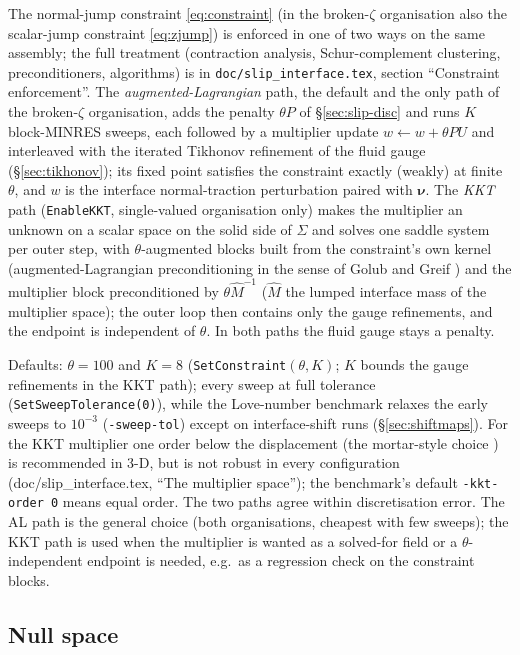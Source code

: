 \documentclass[11pt]{article}
\numberwithin{equation}{section}
\theoremstyle{remark}
\newcommand{\bnu}{\bm{\nu}}
\newcommand{\code}[1]{\texttt{#1}}
\begin{document}
The normal-jump constraint \eqref{eq:constraint} (in the broken-$\zeta$
organisation also the scalar-jump constraint \eqref{eq:zjump}) is
enforced in one of two ways on the same assembly; the full treatment
(contraction analysis, Schur-complement clustering, preconditioners,
algorithms) is in \code{doc/slip\_interface.tex}, section ``Constraint
enforcement''. The \emph{augmented-Lagrangian} path, the default and the
only path of the broken-$\zeta$ organisation, adds the penalty
$\theta P$ of \S\ref{sec:slip-disc} and runs $K$ block-MINRES sweeps,
each followed by a multiplier update $w\leftarrow w + \theta PU$ and
interleaved with the iterated Tikhonov refinement of the fluid gauge
(\S\ref{sec:tikhonov}); its fixed point satisfies the constraint exactly
(weakly) at finite $\theta$, and $w$ is the interface normal-traction
perturbation paired with $\bnu$. The \emph{KKT} path (\code{EnableKKT},
single-valued organisation only) makes the multiplier an unknown on a
scalar space on the solid side of $\Sigma$ and solves one saddle system
per outer step, with $\theta$-augmented blocks built from the
constraint's own kernel (augmented-Lagrangian preconditioning in the
sense of Golub and Greif \cite{GolubGreif2003}) and the multiplier block preconditioned by
$\theta\hat M^{-1}$ ($\hat M$ the lumped interface mass of the multiplier
space); the outer loop then contains only the gauge refinements, and the
endpoint is independent of $\theta$. In both paths the fluid gauge stays
a penalty.

Defaults: $\theta = 100$ and $K = 8$ (\code{SetConstraint}$(\theta, K)$;
$K$ bounds the gauge refinements in the KKT path); every sweep at full
tolerance (\code{SetSweepTolerance(0)}), while the Love-number benchmark
relaxes the early sweeps to $10^{-3}$ (\code{-sweep-tol}) except on
interface-shift runs (\S\ref{sec:shiftmaps}). For the KKT multiplier one
order below the displacement (the mortar-style choice
\cite{Wohlmuth2001}) is recommended in 3-D, but is not robust in every
configuration (doc/slip_interface.tex, ``The multiplier space''); the
benchmark's default \code{-kkt-order 0} means equal order. The two paths agree within
discretisation error. The AL path is the general choice (both
organisations, cheapest with few sweeps); the KKT path is used when the
multiplier is wanted as a solved-for field or a $\theta$-independent
endpoint is needed, e.g.\ as a regression check on the constraint blocks.

\subsection{Null space}
\label{sec:slip-null}
\end{document}
